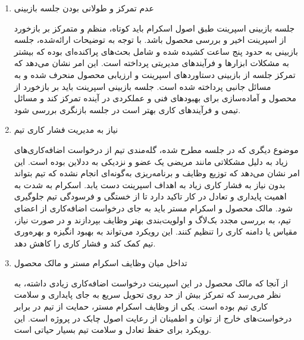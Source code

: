 
\begin{enumerate}
    \item عدم تمرکز و طولانی بودن جلسه بازبینی
    
    جلسه بازبینی اسپرینت طبق اصول اسکرام باید کوتاه، منظم و متمرکز بر بازخورد از اسپرینت اخیر و بررسی محصول باشد. با توجه به توضیحات ارائه‌شده، جلسه بازبینی به حدود پنج ساعت کشیده شده و شامل بحث‌های پراکنده‌ای بوده که بیشتر به مشکلات ابزارها و فرآیندهای مدیریتی پرداخته است. این امر نشان می‌دهد که تمرکز جلسه از بازبینی دستاوردهای اسپرینت و ارزیابی محصول منحرف شده و به مسائل جانبی پرداخته شده است. جلسه بازبینی اسپرینت باید بر بازخورد از محصول و آماده‌سازی برای بهبودهای فنی و عملکردی در آینده تمرکز کند و مسائل تیمی و فرآیندهای کاری بهتر است در جلسه بازنگری بررسی شود.
   
    
    \item نیاز به مدیریت فشار کاری تیم

    موضوع دیگری که در جلسه مطرح شده، گله‌مندی تیم از درخواست اضافه‌کاری‌های زیاد به دلیل مشکلاتی مانند مریضی یک عضو و نزدیکی به ددلاین بوده است. این امر نشان می‌دهد که توزیع وظایف و برنامه‌ریزی به‌گونه‌ای انجام نشده که تیم بتواند بدون نیاز به فشار کاری زیاد به اهداف اسپرینت دست یابد. اسکرام به شدت به اهمیت پایداری و تعادل در کار تاکید دارد تا از خستگی و فرسودگی تیم جلوگیری شود. مالک محصول و اسکرام مستر باید به جای درخواست اضافه‌کاری از اعضای تیم، به بررسی مجدد بک‌لاگ و اولویت‌بندی بهتر وظایف بپردازند و در صورت نیاز، مقیاس یا دامنه کاری را تنظیم کنند. این رویکرد می‌تواند به بهبود انگیزه و بهره‌وری تیم کمک کند و فشار کاری را کاهش دهد.
    
    \item تداخل میان وظایف اسکرام مستر و مالک محصول
    
    از آنجا که مالک محصول در این اسپرینت درخواست اضافه‌کاری زیادی داشته، به نظر می‌رسد که تمرکز بیش از حد روی تحویل سریع به جای پایداری و سلامت کاری تیم بوده است. یکی از وظایف اسکرام مستر، حمایت از تیم در برابر درخواست‌های خارج از توان و اطمینان از رعایت اصول چابک در پروژه است. این رویکرد برای حفظ تعادل و سلامت تیم بسیار حیاتی است.
    \end{enumerate}